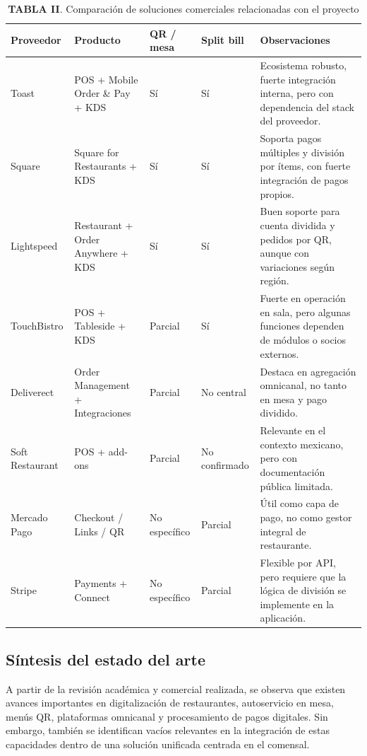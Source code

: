 \documentclass[12pt]{report}
\begin{document}
\begin{table}[H]
\centering
\small
\renewcommand{\arraystretch}{1.22}
\setlength{\tabcolsep}{5pt}
\begin{tabularx}{\textwidth}{p{2.3cm}p{2.9cm}p{1.8cm}p{1.9cm}X}
\toprule
\textbf{Proveedor} & \textbf{Producto} & \textbf{QR / mesa} & \textbf{Split bill} & \textbf{Observaciones} \\
\midrule
Toast & POS + Mobile Order \& Pay + KDS & Sí & Sí & Ecosistema robusto, fuerte integración interna, pero con dependencia del stack del proveedor. \\
Square & Square for Restaurants + KDS & Sí & Sí & Soporta pagos múltiples y división por ítems, con fuerte integración de pagos propios. \\
Lightspeed & Restaurant + Order Anywhere + KDS & Sí & Sí & Buen soporte para cuenta dividida y pedidos por QR, aunque con variaciones según región. \\
TouchBistro & POS + Tableside + KDS & Parcial & Sí & Fuerte en operación en sala, pero algunas funciones dependen de módulos o socios externos. \\
Deliverect & Order Management + Integraciones & Parcial & No central & Destaca en agregación omnicanal, no tanto en mesa y pago dividido. \\
Soft Restaurant & POS + add-ons & Parcial & No confirmado & Relevante en el contexto mexicano, pero con documentación pública limitada. \\
Mercado Pago & Checkout / Links / QR & No específico & Parcial & Útil como capa de pago, no como gestor integral de restaurante. \\
Stripe & Payments + Connect & No específico & Parcial & Flexible por API, pero requiere que la lógica de división se implemente en la aplicación. \\
\bottomrule
\end{tabularx}
\caption*{\normalfont\textbf{TABLA II}. Comparación de soluciones comerciales relacionadas con el proyecto}
\label{tab:soluciones_comerciales}
\end{table}

\subsection{Síntesis del estado del arte}

A partir de la revisión académica y comercial realizada, se observa que existen avances importantes en digitalización de restaurantes, autoservicio en mesa, menús QR, plataformas omnicanal y procesamiento de pagos digitales. Sin embargo, también se identifican vacíos relevantes en la integración de estas capacidades dentro de una solución unificada centrada en el comensal.
\end{document}
